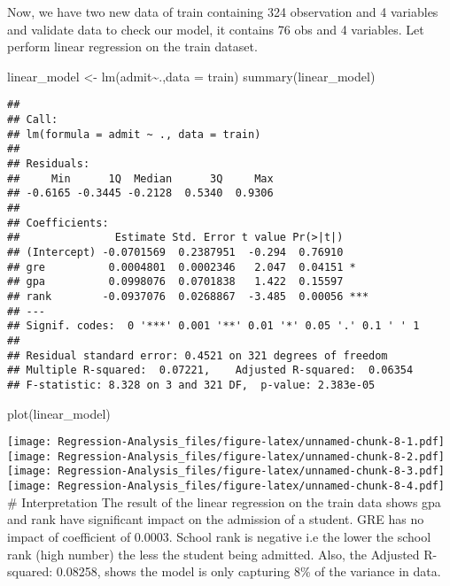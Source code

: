 \documentclass[
]{article}
\newenvironment{Shaded}{\begin{snugshade}}{\end{snugshade}}
\newcommand{\AttributeTok}[1]{\textcolor[rgb]{0.77,0.63,0.00}{#1}}
\newcommand{\FunctionTok}[1]{\textcolor[rgb]{0.00,0.00,0.00}{#1}}
\newcommand{\NormalTok}[1]{#1}
\newcommand{\OtherTok}[1]{\textcolor[rgb]{0.56,0.35,0.01}{#1}}
\newcommand{\SpecialCharTok}[1]{\textcolor[rgb]{0.00,0.00,0.00}{#1}}
\begin{document}
Now, we have two new data of train containing 324 observation and 4
variables and validate data to check our model, it contains 76 obs and 4
variables. Let perform linear regression on the train dataset.

\begin{Shaded}
\begin{Highlighting}[]
\NormalTok{linear\_model }\OtherTok{\textless{}{-}} \FunctionTok{lm}\NormalTok{(admit}\SpecialCharTok{\textasciitilde{}}\NormalTok{.,}\AttributeTok{data =}\NormalTok{ train)}
\FunctionTok{summary}\NormalTok{(linear\_model)}
\end{Highlighting}
\end{Shaded}

\begin{verbatim}
## 
## Call:
## lm(formula = admit ~ ., data = train)
## 
## Residuals:
##     Min      1Q  Median      3Q     Max 
## -0.6165 -0.3445 -0.2128  0.5340  0.9306 
## 
## Coefficients:
##               Estimate Std. Error t value Pr(>|t|)    
## (Intercept) -0.0701569  0.2387951  -0.294  0.76910    
## gre          0.0004801  0.0002346   2.047  0.04151 *  
## gpa          0.0998076  0.0701838   1.422  0.15597    
## rank        -0.0937076  0.0268867  -3.485  0.00056 ***
## ---
## Signif. codes:  0 '***' 0.001 '**' 0.01 '*' 0.05 '.' 0.1 ' ' 1
## 
## Residual standard error: 0.4521 on 321 degrees of freedom
## Multiple R-squared:  0.07221,    Adjusted R-squared:  0.06354 
## F-statistic: 8.328 on 3 and 321 DF,  p-value: 2.383e-05
\end{verbatim}

\begin{Shaded}
\begin{Highlighting}[]
\FunctionTok{plot}\NormalTok{(linear\_model)}
\end{Highlighting}
\end{Shaded}

\texttt{[image: Regression-Analysis\_files/figure-latex/unnamed-chunk-8-1.pdf]}
\texttt{[image: Regression-Analysis\_files/figure-latex/unnamed-chunk-8-2.pdf]}
\texttt{[image: Regression-Analysis\_files/figure-latex/unnamed-chunk-8-3.pdf]}
\texttt{[image: Regression-Analysis\_files/figure-latex/unnamed-chunk-8-4.pdf]}
\# Interpretation The result of the linear regression on the train data
shows gpa and rank have significant impact on the admission of a
student. GRE has no impact of coefficient of 0.0003. School rank is
negative i.e the lower the school rank (high number) the less the
student being admitted. Also, the Adjusted R-squared: 0.08258, shows the
model is only capturing 8\% of the variance in data.
\end{document}
